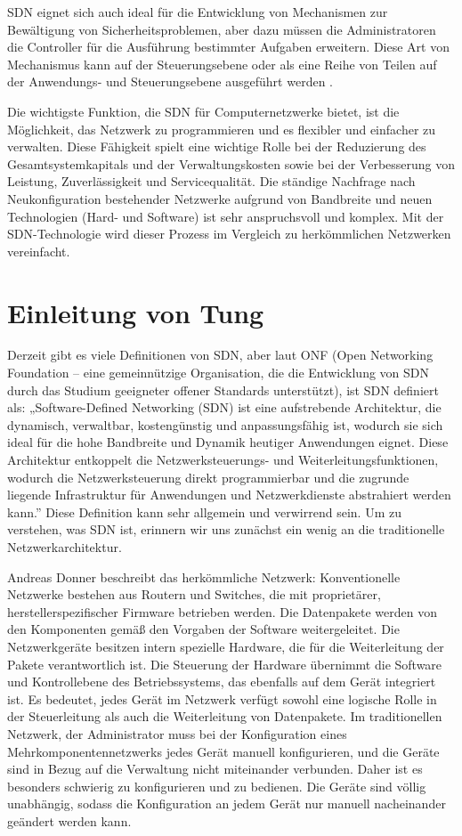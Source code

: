 \documentclass[fontsize=12pt,paper=a4,open=any,parskip=half,
  twoside=false,toc=listof,toc=bibliography,fleqn,leqno,
  captions=nooneline,captions=tableabove,british]{scrbook}
\begin{document}
SDN eignet sich auch ideal für die Entwicklung von Mechanismen zur Bewältigung von Sicherheitsproblemen, aber dazu müssen die Administratoren die Controller für die Ausführung bestimmter Aufgaben erweitern. Diese Art von Mechanismus kann auf der Steuerungsebene oder als eine Reihe von Teilen auf der Anwendungs- und Steuerungsebene ausgeführt werden \cite{morales2015extending}.\par
Die wichtigste Funktion, die SDN für Computernetzwerke bietet, ist die Möglichkeit, das Netzwerk zu programmieren und es flexibler und einfacher zu verwalten. Diese Fähigkeit spielt eine wichtige Rolle bei der Reduzierung des Gesamtsystemkapitals und der Verwaltungskosten sowie bei der Verbesserung von Leistung, Zuverlässigkeit und Servicequalität. Die ständige Nachfrage nach Neukonfiguration bestehender Netzwerke aufgrund von Bandbreite und neuen Technologien (Hard- und Software) ist sehr anspruchsvoll und komplex. Mit der SDN-Technologie wird dieser Prozess im Vergleich zu herkömmlichen Netzwerken vereinfacht\cite{hasan2020sdn}.


\section*{Einleitung von Tung}\label{einl-tung}
Derzeit gibt es viele Definitionen von SDN, aber laut ONF (Open Networking Foundation – eine gemeinnützige Organisation, die die Entwicklung von SDN durch das Studium geeigneter offener Standards unterstützt), ist SDN definiert als: „Software-Defined Networking (SDN) ist eine aufstrebende Architektur, die dynamisch, verwaltbar, kostengünstig und anpassungsfähig ist, wodurch sie sich ideal für die hohe Bandbreite und Dynamik heutiger Anwendungen eignet. Diese Architektur entkoppelt die Netzwerksteuerungs- und Weiterleitungsfunktionen, wodurch die Netzwerksteuerung direkt programmierbar und die zugrunde liegende Infrastruktur für Anwendungen und Netzwerkdienste abstrahiert werden kann.”\cite{ONFTung} Diese Definition kann sehr allgemein und verwirrend sein. Um zu verstehen, was SDN ist, erinnern wir uns zunächst ein wenig an die traditionelle Netzwerkarchitektur.


Andreas Donner beschreibt das herkömmliche Netzwerk: 
Konventionelle Netzwerke bestehen aus Routern und Switches, die mit proprietärer, herstellerspezifischer      Firmware betrieben werden. Die Datenpakete werden von den Komponenten gemäß den Vorgaben der Software weitergeleitet. Die Netzwerkgeräte besitzen intern spezielle Hardware, die für die Weiterleitung der Pakete verantwortlich ist. Die Steuerung der Hardware übernimmt die Software und Kontrollebene des Betriebssystems, das ebenfalls auf dem Gerät integriert ist. \cite{tranetworkTung}
Es bedeutet, jedes Gerät im Netzwerk verfügt sowohl eine logische Rolle in der Steuerleitung als auch die Weiterleitung von Datenpakete. Im traditionellen Netzwerk, der Administrator muss bei der Konfiguration eines Mehrkomponentennetzwerks jedes Gerät manuell konfigurieren, und die Geräte sind in Bezug auf die Verwaltung nicht miteinander verbunden. Daher ist es besonders schwierig zu konfigurieren und zu bedienen. Die Geräte sind völlig unabhängig, sodass die Konfiguration an jedem Gerät nur manuell nacheinander geändert werden kann.
\end{document}
